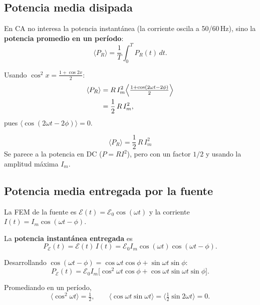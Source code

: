 \documentclass[12pt,a4paper]{article}
\begin{document}
\subsection{Potencia media disipada}

En CA no interesa la potencia instantánea (la corriente oscila a
50/60\,Hz), sino la \textbf{potencia promedio en un período}:
\[
\langle P_R \rangle = \frac{1}{T}\int_0^T P_R(t)\,dt.
\]

Usando \(\displaystyle \cos^2 x = \frac{1 + \cos 2x}{2}\):
\[
\begin{aligned}
\langle P_R \rangle
&= R\, I_m^2 \Bigl\langle \tfrac{1 + \cos(2\omega t - 2\phi)}{2}
   \Bigr\rangle \\
&= \frac{1}{2}\, R\, I_m^2,
\end{aligned}
\]
pues \(\langle \cos(2\omega t - 2\phi) \rangle = 0\).

\begin{keybox}
\[
\boxed{\langle P_R \rangle = \frac12\, R\, I_m^2}
\]
Se parece a la potencia en DC (\(P = R I^2\)), pero con un factor
\(1/2\) y usando la amplitud máxima \(I_m\).
\end{keybox}



\subsection{Potencia media entregada por la fuente}

La FEM de la fuente es \(\mathcal{E}(t) = \mathcal{E}_0 \cos(\omega t)\)
y la corriente \(I(t) = I_m \cos(\omega t - \phi)\).

La \textbf{potencia instantánea entregada} es
\[
P_{\mathcal{E}}(t) = \mathcal{E}(t)\, I(t)
= \mathcal{E}_0 I_m \cos(\omega t) \cos(\omega t - \phi).
\]

Desarrollando \(\cos(\omega t - \phi) = \cos\omega t \cos\phi
+ \sin\omega t \sin\phi\):
\[
P_{\mathcal{E}}(t) = \mathcal{E}_0 I_m
\bigl[ \cos^2\omega t \cos\phi
     + \cos\omega t \sin\omega t \sin\phi \bigr].
\]

Promediando en un período,
\[
\langle \cos^2\omega t \rangle = \tfrac12,\qquad
\langle \cos\omega t \sin\omega t \rangle =
\langle \tfrac12 \sin 2\omega t \rangle = 0.
\]
\end{document}
